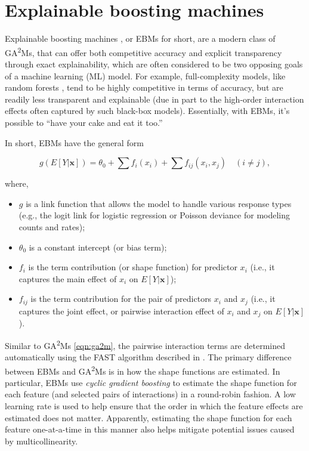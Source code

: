 \section{Explainable boosting
machines}\label{explainable-boosting-machines}

Explainable boosting machines \citep{nori-2019-interpret}, or EBMs for
short, are a modern class of GA\textsuperscript{2}Ms, that can offer
both competitive accuracy and explicit transparency through exact
explainability, which are often considered to be two opposing goals of a
machine learning (ML) model. For example, full-complexity models, like
random forests \citep{breiman-2001-rf}, tend to be highly competitive in
terms of accuracy, but are readily less transparent and explainable (due
in part to the high-order interaction effects often captured by such
black-box models). Essentially, with EBMs, it's possible to ``have your
cake and eat it too.''

In short, EBMs have the general form

\begin{equation}
g\left(E\left[Y|\boldsymbol{x}\right]\right) = \theta_0 + \sum f_i\left(x_i\right) + \sum f_{ij}\left(x_i, x_j\right) \quad \left(i \ne j\right),
  \label{eqn:ebm}
\end{equation}

where,

\begin{itemize}
\item
  \(g\) is a link function that allows the model to handle various
  response types (e.g., the logit link for logistic regression or
  Poisson deviance for modeling counts and rates);
\item
  \(\theta_0\) is a constant intercept (or bias term);
\item
  \(f_i\) is the term contribution (or shape function) for predictor
  \(x_i\) (i.e., it captures the main effect of \(x_i\) on
  \(E\left[Y|\boldsymbol{x}\right]\));
\item
  \(f_{ij}\) is the term contribution for the pair of predictors \(x_i\)
  and \(x_j\) (i.e., it captures the joint effect, or pairwise
  interaction effect of \(x_i\) and \(x_j\) on
  \(E\left[Y|\boldsymbol{x}\right]\)).
\end{itemize}

Similar to GA\textsuperscript{2}Ms \eqref{eqn:ga2m}, the pairwise
interaction terms are determined automatically using the FAST algorithm
described in \citet{lou-2013-ga2m}. The primary difference between EBMs
and GA\textsuperscript{2}Ms is in how the shape functions are estimated.
In particular, EBMs use \emph{cyclic gradient boosting}
\citep{nori-2019-interpret, wick-2019-cyclic} to estimate the shape
function for each feature (and selected pairs of interactions) in a
round-robin fashion. A low learning rate is used to help ensure that the
order in which the feature effects are estimated does not matter.
Apparently, estimating the shape function for each feature one-at-a-time
in this manner also helps mitigate potential issues caused by
multicollinearity.

